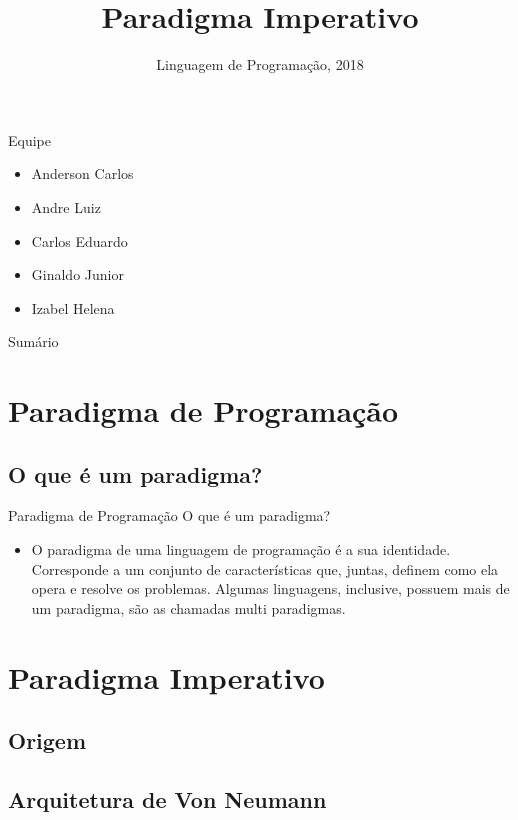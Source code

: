 \documentclass{beamer}
\title{Paradigma Imperativo}
\author{\inst{}}
\institute[Instituto Federal de Alagoas]
{
  \inst{1}%
  Departamento de Sistemas de Informação\\
  Centro Universitário Católica de Santa Catarina em Jaraguá do Sul
  \and
  \inst{2}%
  Departamento de Sistemas de Informação\\
  Centro Universitário Católica de Santa Catarina em Jaraguá do Sul}
\date{Linguagem de Programação, 2018}
\begin{document}
\begin{frame}
  \titlepage    
\end{frame}

\begin{frame}{Equipe}
    \begin{itemize}
        \item{Anderson Carlos}
        \item{Andre Luiz}
        \item{Carlos Eduardo}
        \item{Ginaldo Junior}
        \item{Izabel Helena}
    \end{itemize}
\end{frame}

\begin{frame}{Sumário}
  \tableofcontents
\end{frame}

\section{Paradigma de Programação}
\subsection{O que é um paradigma?}


\begin{frame}{Paradigma de Programação}
    O que é um paradigma?
    \begin{itemize}
    \item{O paradigma de uma linguagem de programação é a sua identidade. Corresponde a um conjunto de características que, juntas, definem como ela opera e resolve os problemas. Algumas linguagens, inclusive, possuem mais de um paradigma, são as chamadas multi paradigmas.}
  \end{itemize}
\end{frame}

\section{Paradigma Imperativo}

\subsection{Origem}
\subsection{Arquitetura de Von Neumann}
\end{document}
